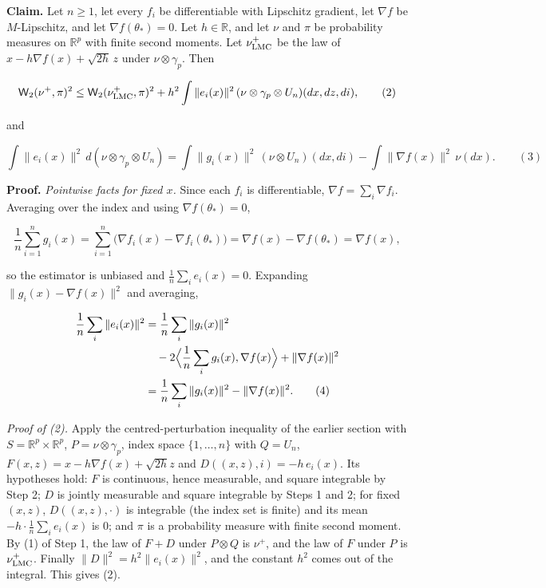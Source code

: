 \documentclass[11pt,a4paper]{article}
\begin{document}
\textbf{Claim.} Let \(n\ge1\), let every \(f_i\) be differentiable with Lipschitz gradient, let \(\nabla f\) be \(M\)-Lipschitz, and let \(\nabla f(\theta_*)=0\). Let \(h\in\mathbb R\), and let \(\nu\) and \(\pi\) be probability measures on \(\mathbb R^p\) with finite second moments. Let \(\nu^+_{\rm LMC}\) be the law of \(x-h\nabla f(x)+\sqrt{2h}\,z\) under \(\nu\otimes\gamma_p\). Then


\[\mathsf W_2(\nu^+,\pi)^2\le\mathsf W_2(\nu^+_{\rm LMC},\pi)^2+h^2\int\|e_i(x)\|^2\,(\nu\otimes\gamma_p\otimes U_n)(dx,dz,di),\qquad(2)\]


and


\[\int\|e_i(x)\|^2\,d(\nu\otimes\gamma_p\otimes U_n)=\int\|g_i(x)\|^2\,(\nu\otimes U_n)(dx,di)-\int\|\nabla f(x)\|^2\,\nu(dx).\qquad(3)\]


\textbf{Proof.} \emph{Pointwise facts for fixed \(x\).} Since each \(f_i\) is differentiable, \(\nabla f=\sum_i\nabla f_i\). Averaging over the index and using \(\nabla f(\theta_*)=0\),


\[\frac1n\sum_{i=1}^ng_i(x)=\sum_{i=1}^n\bigl(\nabla f_i(x)-\nabla f_i(\theta_*)\bigr)=\nabla f(x)-\nabla f(\theta_*)=\nabla f(x),\]


so the estimator is unbiased and \(\frac1n\sum_ie_i(x)=0\). Expanding \(\|g_i(x)-\nabla f(x)\|^2\) and averaging,


\[\begin{aligned}
\frac1n\sum_i\|e_i(x)\|^2
&=\frac1n\sum_i\|g_i(x)\|^2\\
&\quad-2\Bigl\langle\frac1n\sum_ig_i(x),\nabla f(x)\Bigr\rangle
  +\|\nabla f(x)\|^2\\
&=\frac1n\sum_i\|g_i(x)\|^2-\|\nabla f(x)\|^2.
\qquad(4)
\end{aligned}\]


\emph{Proof of (2).} Apply the centred-perturbation inequality of the earlier section with \(S=\mathbb R^p\times\mathbb R^p\), \(P=\nu\otimes\gamma_p\), index space \(\{1,\dots,n\}\) with \(Q=U_n\), \(F(x,z)=x-h\nabla f(x)+\sqrt{2h}z\) and \(D((x,z),i)=-h\,e_i(x)\). Its hypotheses hold: \(F\) is continuous, hence measurable, and square integrable by Step 2; \(D\) is jointly measurable and square integrable by Steps 1 and 2; for fixed \((x,z)\), \(D((x,z),\cdot)\) is integrable (the index set is finite) and its mean \(-h\cdot\frac1n\sum_ie_i(x)\) is \(0\); and \(\pi\) is a probability measure with finite second moment. By (1) of Step 1, the law of \(F+D\) under \(P\otimes Q\) is \(\nu^+\), and the law of \(F\) under \(P\) is \(\nu^+_{\rm LMC}\). Finally \(\|D\|^2=h^2\|e_i(x)\|^2\), and the constant \(h^2\) comes out of the integral. This gives (2).
\end{document}
